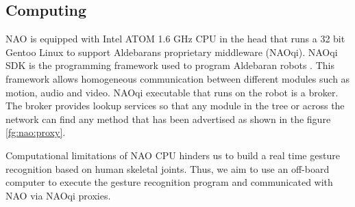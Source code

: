 

\subsection{Computing} NAO is equipped with Intel ATOM 1.6 GHz CPU in the head that runs a 32 bit Gentoo Linux to support Aldebarans proprietary middleware (NAOqi). NAOqi SDK is the programming framework used to program Aldebaran robots \cite{8}. This framework allows homogeneous communication between different modules such as motion, audio and video. NAOqi executable that runs on the robot is a broker. The broker provides lookup services so that any module in the tree or across the network can find any method that has been advertised as shown in the figure \ref{fg:nao:proxy}.



Computational limitations \cite{17} of NAO CPU hinders us to build a real time gesture recognition based on human skeletal joints. Thus, we aim to use an off-board computer to execute the gesture recognition program and communicated with NAO via NAOqi proxies. 
